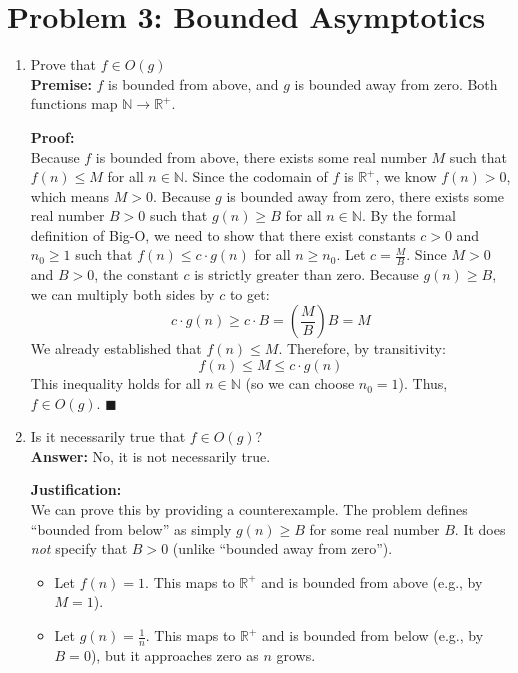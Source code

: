 \documentclass[11pt]{article}
\begin{document}
\section*{Problem 3: Bounded Asymptotics}
\begin{enumerate}[label=\textbf{(\alph*)}]

\item Prove that $f \in O(g)$ \\
\textbf{Premise:} $f$ is bounded from above, and $g$ is bounded away from zero. Both functions map $\mathbb{N} \to \mathbb{R}^+$.

\textbf{Proof:}\\
Because $f$ is bounded from above, there exists some real number $M$ such that $f(n) \le M$ for all $n \in \mathbb{N}$. Since the codomain of $f$ is $\mathbb{R}^+$, we know $f(n) > 0$, which means $M > 0$.
Because $g$ is bounded away from zero, there exists some real number $B > 0$ such that $g(n) \ge B$ for all $n \in \mathbb{N}$.
By the formal definition of Big-O, we need to show that there exist constants $c > 0$ and $n_0 \ge 1$ such that $f(n) \le c \cdot g(n)$ for all $n \ge n_0$.
Let $c = \frac{M}{B}$. Since $M > 0$ and $B > 0$, the constant $c$ is strictly greater than zero.
Because $g(n) \ge B$, we can multiply both sides by $c$ to get:
\[
c \cdot g(n) \ge c \cdot B = \left(\frac{M}{B}\right) B = M
\]
We already established that $f(n) \le M$. Therefore, by transitivity:
\[
f(n) \le M \le c \cdot g(n)
\]
This inequality holds for all $n \in \mathbb{N}$ (so we can choose $n_0 = 1$). Thus, $f \in O(g)$. \hfill $\blacksquare$

\item Is it necessarily true that $f \in O(g)$? \\
\textbf{Answer:} No, it is not necessarily true.

\textbf{Justification:}\\
We can prove this by providing a counterexample. The problem defines ``bounded from below'' as simply $g(n) \ge B$ for some real number $B$. It does \textit{not} specify that $B > 0$ (unlike ``bounded away from zero'').

\begin{itemize}
    \item Let $f(n) = 1$. This maps to $\mathbb{R}^+$ and is bounded from above (e.g., by $M=1$).
    \item Let $g(n) = \frac{1}{n}$. This maps to $\mathbb{R}^+$ and is bounded from below (e.g., by $B=0$), but it approaches zero as $n$ grows.
\end{itemize}


\end{enumerate}
\end{document}
